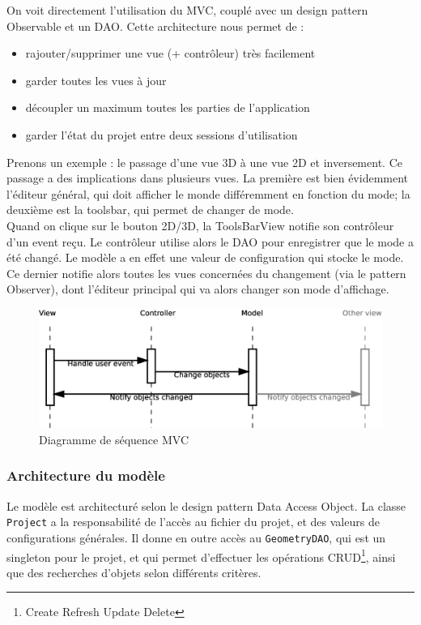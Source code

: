 	On voit directement l'utilisation du MVC, couplé avec un design pattern
	Observable et un DAO. Cette architecture nous permet de :
	\begin{itemize}
		\item rajouter/supprimer une vue (+ contrôleur) très facilement
		\item garder toutes les vues à jour
		\item découpler un maximum toutes les parties de l'application
		\item garder l'état du projet entre deux sessions d'utilisation
	\end{itemize}

	Prenons un exemple : le passage d'une vue 3D à une vue 2D et inversement.
	Ce passage a des implications dans plusieurs vues. La première est
	bien évidemment l'éditeur général, qui doit afficher le monde différemment
	en fonction du mode; la deuxième est la toolsbar, qui permet de changer de
	mode.\\

	Quand on clique sur le bouton 2D/3D, la ToolsBarView notifie son contrôleur
	d'un event reçu. Le contrôleur utilise alors le DAO pour enregistrer que
	le mode a été changé. Le modèle a en effet une valeur de configuration qui
	stocke le mode. Ce dernier notifie alors toutes les vues concernées du 
	changement (via le pattern Observer), dont l'éditeur principal qui va alors
	changer son mode d'affichage.\\

	\begin{figure}[h]
		\includegraphics[width=\textwidth]{uml/MVC-sequence.eps}
		\caption{\label{fig:mvc:sequence} Diagramme de séquence MVC}
	\end{figure}

	\subsubsection{Architecture du modèle}
	Le modèle est architecturé selon le design pattern Data Access Object.
	La classe \texttt{Project} a la responsabilité de l'accès au fichier du
	projet, et des valeurs de configurations générales. Il donne en outre accès
	au \texttt{GeometryDAO}, qui est un singleton pour le projet, et qui permet
	d'effectuer les opérations CRUD\footnote{Create Refresh Update Delete},
	ainsi que des recherches d'objets selon différents critères.


